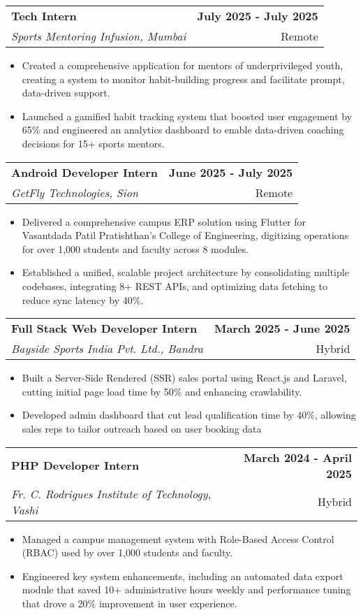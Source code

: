 \documentclass[10pt,a4paper]{article}
\makeatletter
\newcommand{\resumeItem}[1]{\item\small{#1}}
\newcommand{\resumeSubheading}[4]{
  \vspace{0pt}
  \begin{tabular*}{\textwidth}[t]{l@{\extracolsep{\fill}}r}
    \textbf{#1} & \small\textbf{#2} \\
    \textit{\small#3} & \small#4 \\
  \end{tabular*}\vspace{0pt}
}
\makeatother
\begin{document}
\vspace{0.1em}

\resumeSubheading
{Tech Intern}{July 2025 - July 2025}
{Sports Mentoring Infusion, Mumbai}{Remote}
\begin{itemize}
    \resumeItem{Created a comprehensive application for mentors of underprivileged youth, creating a system to monitor habit-building progress and facilitate prompt, data-driven support.}
    \resumeItem{Launched a gamified habit tracking system that boosted user engagement by 65\% and engineered an analytics dashboard to enable data-driven coaching decisions for 15+ sports mentors.}
    
\end{itemize}

\vspace{0.1em}

\resumeSubheading
{Android Developer Intern}{June 2025 - July 2025}
{GetFly Technologies, Sion}{Remote}
\begin{itemize}
    \resumeItem{Delivered a comprehensive campus ERP solution using Flutter for Vasantdada Patil Pratishthan's College of Engineering, digitizing operations for over 1,000 students and faculty across 8 modules.}
\resumeItem{Established a unified, scalable project architecture by consolidating multiple codebases, integrating 8+ REST APIs, and optimizing data fetching to reduce sync latency by 40\%.}


\end{itemize}

\vspace{0.1em}

\resumeSubheading
{Full Stack Web Developer Intern}{March 2025 - June 2025}
{Bayside Sports India Pvt. Ltd., Bandra}{Hybrid}
\begin{itemize}
    \resumeItem{Built a Server-Side Rendered (SSR) sales portal using React.js and Laravel, cutting initial page load time by 50\% and enhancing crawlability.}
    \resumeItem{Developed admin dashboard that cut lead qualification time by 40\%, allowing sales reps to tailor outreach based on user booking data}
\end{itemize}

\vspace{0.1em}

\resumeSubheading
{PHP Developer Intern}{March 2024 - April 2025}  
{Fr. C. Rodrigues Institute of Technology, Vashi}{Hybrid}
\begin{itemize}
    \resumeItem{Managed a campus management system with Role-Based Access Control (RBAC) used by over 1,000 students and faculty.}
    \resumeItem{Engineered key system enhancements, including an automated data export module that saved 10+ administrative hours weekly and performance tuning that drove a 20\% improvement in user experience.}
\end{itemize}
\end{document}
